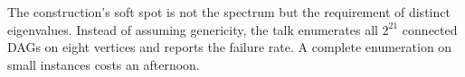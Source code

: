 \begin{aside}
The construction's soft spot is not the spectrum but the requirement of distinct eigenvalues. Instead
of assuming genericity, the talk enumerates all $2^{21}$ connected DAGs on eight vertices and reports
the failure rate. A complete enumeration on small instances costs an afternoon.
\end{aside}
